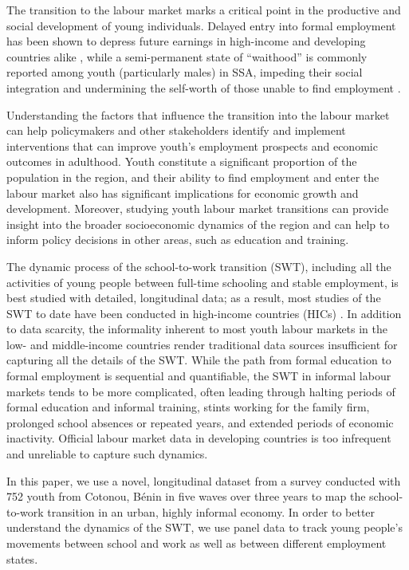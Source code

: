 \documentclass[
  a4paper, twoside, 12pt]{book}
\begin{document}
The transition to the labour market marks a critical point in the productive and social development of young individuals. Delayed entry into formal employment has been shown to depress future earnings in high-income and developing countries alike \autocite{bridges2017}, while a semi-permanent state of ``waithood'' is commonly reported among youth (particularly males) in SSA, impeding their social integration and undermining the self-worth of those unable to find employment \autocite{mains2011,honwana2012}.

Understanding the factors that influence the transition into the labour market can help policymakers and other stakeholders identify and implement interventions that can improve youth's employment prospects and economic outcomes in adulthood. Youth constitute a significant proportion of the population in the region, and their ability to find employment and enter the labour market also has significant implications for economic growth and development. Moreover, studying youth labour market transitions can provide insight into the broader socioeconomic dynamics of the region and can help to inform policy decisions in other areas, such as education and training.

The dynamic process of the school-to-work transition (SWT), including all the activities of young people between full-time schooling and stable employment, is best studied with detailed, longitudinal data; as a result, most studies of the SWT to date have been conducted in high-income countries (HICs) \autocite{nilsson2019}. In addition to data scarcity, the informality inherent to most youth labour markets in the low- and middle-income countries render traditional data sources insufficient for capturing all the details of the SWT. While the path from formal education to formal employment is sequential and quantifiable, the SWT in informal labour markets tends to be more complicated, often leading through halting periods of formal education and informal training, stints working for the family firm, prolonged school absences or repeated years, and extended periods of economic inactivity. Official labour market data in developing countries is too infrequent and unreliable to capture such dynamics.

In this paper, we use a novel, longitudinal dataset from a survey conducted with 752 youth from Cotonou, Bénin in five waves over three years to map the school-to-work transition in an urban, highly informal economy. In order to better understand the dynamics of the SWT, we use panel data to track young people's movements between school and work as well as between different employment states.
\end{document}
